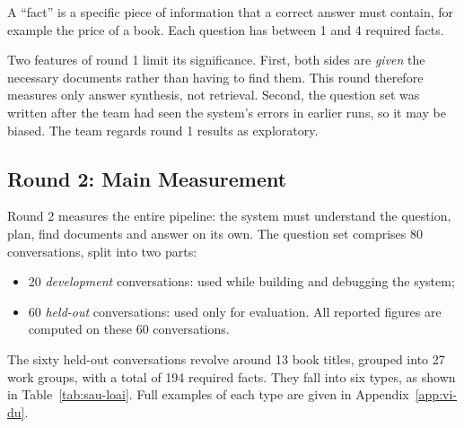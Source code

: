 A ``fact'' is a specific piece of information that a correct answer must contain, for example the price of a book. Each question has between 1 and 4 required facts.

Two features of round 1 limit its significance. First, both sides are \emph{given} the necessary documents rather than having to find them. This round therefore measures only answer synthesis, not retrieval. Second, the question set was written after the team had seen the system's errors in earlier runs, so it may be biased. The team regards round 1 results as exploratory.

\subsection{Round 2: Main Measurement}

Round 2 measures the entire pipeline: the system must understand the question, plan, find documents and answer on its own. The question set comprises 80 conversations, split into two parts:

\begin{itemize}
    \item 20 \emph{development} conversations: used while building and debugging the system;
    \item 60 \emph{held-out} conversations: used only for evaluation. All reported figures are computed on these 60 conversations.
\end{itemize}

The sixty held-out conversations revolve around 13 book titles, grouped into 27 work groups, with a total of 194 required facts. They fall into six types, as shown in Table~\ref{tab:sau-loai}. Full examples of each type are given in Appendix~\ref{app:vi-du}.

